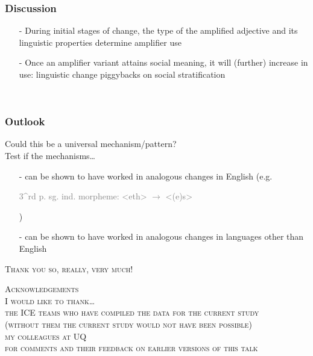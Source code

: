 \documentclass[12pt, table]{beamer}
\begin{document}
\begin{frame}
\frametitle{Discussion}
\begin{itemize}
\item[-] During initial stages of change, the type of the amplified adjective and its linguistic properties determine amplifier use
\item[-] Once an amplifier variant attains social meaning, it will (further) increase in use: linguistic change piggybacks on social stratification\\[.2cm]
\begin{scriptsize}
 \\
\hfill\textcolor{gray}{\citep{labov2002driving}}
\end{scriptsize}
\end{itemize}
\end{frame}

\begin{frame}
\frametitle{Outlook}
Could this be a universal mechanism/pattern?\\[.5cm]
Test if the mechanisms\dots
\begin{itemize}
\item[-] can be shown to have worked in analogous changes in English (e.g.  \begin{scriptsize}
 \textcolor{gray}{3^{rd} p. sg. ind. morpheme: <eth> $\rightarrow$ <(e)s>}
\end{scriptsize})
\item[-] can be shown to have worked in analogous changes in languages other than English
\end{itemize} 
\end{frame}

\begin{frame}
\begin{center}
\textsc{\textcolor{uq}{Thank you so, really, very much!}}\\[1cm]
\begin{scriptsize}
\textsc{\textcolor{uq}{Acknowledgements}\\[.25cm]
I would like to thank\dots\\[.25cm]
the ICE teams who have compiled the data for the current study \\
(without them the current study would not have been possible)\\[.25cm]
my colleagues at UQ \\
for comments and their feedback on earlier versions of this talk}
\end{scriptsize}
\end{center}
\end{frame}
\end{document}
